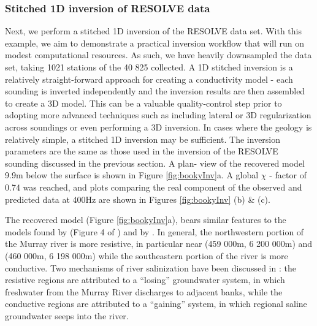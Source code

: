 \subsubsection{Stitched 1D inversion of RESOLVE data}

Next, we perform a stitched 1D inversion of the RESOLVE data set. With this
example, we aim to demonstrate a practical inversion workflow that will run on
modest computational resources. As such, we have heavily downsampled the data
set, taking 1021 stations of the 40 825 collected. A 1D stitched inversion is
a relatively straight-forward approach for creating a conductivity model -
each sounding is inverted independently and the inversion results are then
assembled to create a 3D model. This can be a valuable quality-control step
prior to adopting more advanced techniques such as including lateral or 3D
regularization across soundings or even performing a 3D inversion. In cases
where the geology is relatively simple, a stitched 1D inversion may be
sufficient. The inversion parameters are the same as those used in the
inversion of the RESOLVE sounding discussed in the previous section. A plan-
view of the recovered model 9.9m below the surface is shown in Figure
\ref{fig:bookyInv}a. A global $\chi$ - factor of 0.74 was reached,
and plots comparing the real component of the observed and
predicted data at 400Hz are shown in Figures \ref{fig:bookyInv} (b) \& (c).

The recovered model (Figure \ref{fig:bookyInv}a), bears similar features to
the models found by \cite{Viezzoli2010} (Figure 4 of \cite{Viezzoli2010}) and by \cite{Yang2017}. In
general, the northwestern portion of the Murray river is more resistive, in
particular near (459 000m, 6 200 000m) and (460 000m, 6 198 000m) while the
southeastern portion of the river is more conductive. Two mechanisms of river
salinization have been discussed in \cite{Munday2006, Viezzoli2010}: the
resistive regions are attributed to a ``losing'' groundwater system, in which
freshwater from the Murray River discharges to adjacent banks, while the
conductive regions are attributed to a ``gaining'' system, in which regional
saline groundwater seeps into the river.

